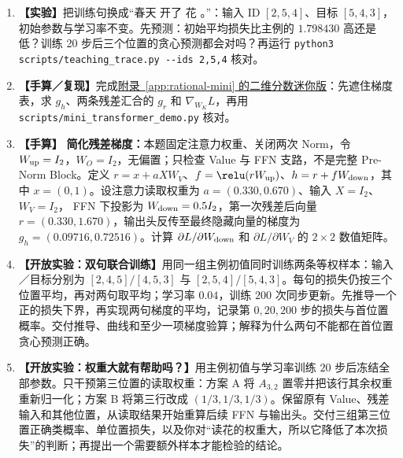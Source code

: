 \begin{enumerate}[label={},leftmargin=4.8em,itemsep=4pt]
\item[\textbf{C-080.}] \leavevmode{}\label{exercise:C-080}\label{exercise:training-sentence-change}\textbf{【实验】}把训练句换成“春天 开了 花 。”：输入 ID $[2,5,4]$、目标 $[5,4,3]$，初始参数与学习率不变。先预测：初始平均损失比主例的 $1.798430$ 高还是低？训练 20 步后三个位置的贪心预测都会对吗？再运行 \texttt{python3 scripts/teaching\_trace.py -{}-ids 2,5,4} 核对。
\item[\textbf{C-081.}] \leavevmode{}\label{exercise:C-081}\label{exercise:rational-mini-gradient}\textbf{【手算／复现】}完成\hyperref[app:rational-mini]{附录~\ref*{app:rational-mini} 的二维分数迷你版}：先遮住梯度表，求 $g_h$、两条残差汇合的 $g_r$ 和 $\nabla_{W_K}L$，再用 \nolinkurl{scripts/mini_transformer_demo.py} 核对。
\item[\textbf{C-082.}] \leavevmode{}\label{exercise:C-082}\label{exercise:simplified-block-gradient}\label{exercise:linked-22c-language-training}  \textbf{【手算】} \textbf{简化残差梯度：}本题固定注意力权重、关闭两次 Norm，令 $W_{\rm up}=I_2$，$W_O=I_2$，无偏置；只检查 Value 与 FFN 支路，不是完整 Pre-Norm Block。定义 $r=x+aXW_V$、$f=\relu(rW_{\rm up})$、$h=r+fW_{\rm down}$，其中 $x=(0,1)$。设注意力读取权重为
$a=(0.330,0.670)$、输入 $X=I_2$、$W_V=I_2$，
FFN 下投影为 $W_{\rm down}=0.5I_2$，第一次残差后向量
$r=(0.330,1.670)$，输出头反传至最终隐藏向量的梯度为
$g_h=(0.09716,0.72516)$。计算
$\partial L/\partial W_{\rm down}$ 和
$\partial L/\partial W_V$ 的 $2\times2$ 数值矩阵。
\item[\textbf{C-083.}] \leavevmode{}\label{exercise:C-083}\label{exercise:joint-prefix-loss-floor}\textbf{【开放实验：双句联合训练】}用同一组主例初值同时训练两条等权样本：输入／目标分别为 $[2,4,5]/[4,5,3]$ 与 $[2,5,4]/[5,4,3]$。每句的损失仍按三个位置平均，再对两句取平均；学习率 $0.04$，训练 $200$ 次同步更新。先推导一个正的损失下界，再实现两句梯度的平均，记录第 $0,20,200$ 步的损失与首位置概率。交付推导、曲线和至少一项梯度验算；解释为什么两句不能都在首位置贪心预测正确。
\item[\textbf{C-084.}] \leavevmode{}\label{exercise:C-084}\label{exercise:attention-causal-intervention}\textbf{【开放实验：权重大就有帮助吗？】}用主例初值与学习率训练 $20$ 步后冻结全部参数。只干预第三位置的读取权重：方案 A 将 $A_{3,2}$ 置零并把该行其余权重重新归一化；方案 B 将第三行改成 $(1/3,1/3,1/3)$。保留原有 Value、残差输入和其他位置，从读取结果开始重算后续 FFN 与输出头。交付三组第三位置正确类概率、单位置损失，以及你对“读花的权重大，所以它降低了本次损失”的判断；再提出一个需要额外样本才能检验的结论。
\end{enumerate}
